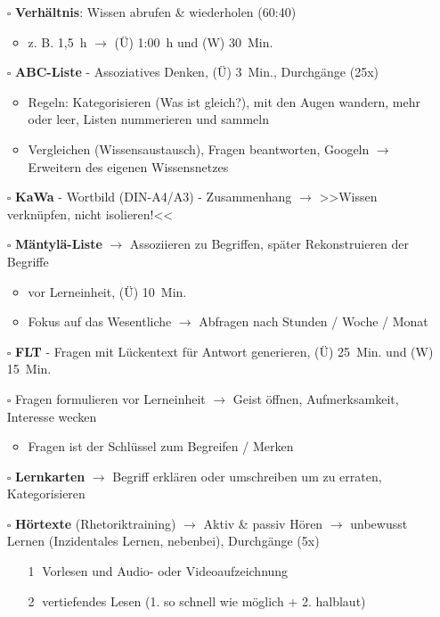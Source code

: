 \documentclass[a4paper,12pt,fleqn,parskip=half]{scrartcl}
\begin{document}
	\begin{itemize} 
		\item [$\square$] \textbf{Verhältnis}: Wissen abrufen \& wiederholen (60:40) 
		\begin{itemize} 
			\item z. B. 1,5~h $\to$ (Ü) 1:00~h und (W) 30~Min.
		\end{itemize}
		\item [$\square$] \textbf{ABC-Liste} - Assoziatives Denken, (Ü) 3~Min., Durchgänge (25x)
		\begin{itemize} 
			\item Regeln: Kategorisieren (Was ist gleich?), mit den Augen wandern, mehr oder leer, Listen nummerieren und sammeln
			\item Vergleichen (Wissensaustausch), Fragen beantworten, Googeln $\to$ Erweitern des eigenen Wissensnetzes
		\end{itemize}
		\item [$\square$] \textbf{KaWa} - Wortbild (DIN-A4/A3) - Zusammenhang $\to$ >>Wissen verknüpfen, nicht isolieren!<<
		\item [$\square$] \textbf{Mäntylä-Liste} $\to$ Assoziieren zu Begriffen, später  Rekonstruieren der Begriffe
		\begin{itemize} 
			\item vor Lerneinheit, (Ü) 10~Min.
			\item Fokus auf das Wesentliche $\to$ Abfragen nach Stunden / Woche / Monat
		\end{itemize}
		\item [$\square$] \textbf{FLT} - Fragen mit Lückentext für Antwort generieren, (Ü) 25~Min. und (W) 15~Min.
		\item [$\square$] Fragen formulieren vor Lerneinheit $\to$ Geist öffnen, Aufmerksamkeit, Interesse wecken
		\begin{itemize} 
			\item Fragen ist der Schlüssel zum Begreifen / Merken
		\end{itemize}
		\item [$\square$] \textbf{Lernkarten} $\to$ Begriff erklären oder umschreiben um zu erraten, Kategorisieren
		\item [$\square$] \textbf{Hörtexte} (Rhetoriktraining)  $\to$ Aktiv \& passiv Hören $\to$ unbewusst Lernen (Inzidentales Lernen, nebenbei), Durchgänge (5x)
		\begin{itemize} 
			\item [\textcircled{1}] Vorlesen und Audio- oder Videoaufzeichnung
			\item [\textcircled{2}] vertiefendes Lesen (1. so schnell wie möglich + 2. halblaut)

\end{itemize}
\end{itemize}
\end{document}
